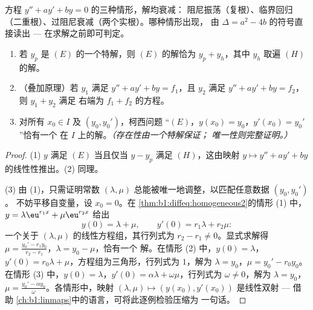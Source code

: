 \begin{omfigure}

{\small 方程 $y'' + ay' + by = 0$ 的三种情形，解均衰减：
阻尼振荡（复根）、临界回归
（二重根）、过阻尼衰减（两个实根）。哪种情形出现，
由 $\Delta = a^2 - 4b$ 的符号直接读出 ---
在求解之前即可判定。}
\end{omfigure}

\begin{theorem}[结构与柯西问题]\label{thm:b1:diffeq:structure2}
\begin{enumerate}
  \item 若 $y_p$ 是 $(E)$ 的一个特解，则
        $(E)$ 的解恰为 $y_p + y_h$，其中 $y_h$ 取遍
        $(H)$ 的解。
  \item （叠加原理）若 $y_1$ 满足 $y'' + ay' + by = f_1$，且
        $y_2$ 满足 $y'' + ay' + by = f_2$，则 $y_1 + y_2$ 满足
        右端为 $f_1 + f_2$ 的方程。
  \item 对所有 $x_0 \in I$ 及 $(y_0, y_0')$，柯西问题
        “$(E)$，$y(x_0) = y_0$，$y'(x_0) = y_0'$”恰有一个
        在 $I$ 上的解。\emph{（存在性由一个特解保证；
        唯一性则完整证明。）}
\end{enumerate}
\end{theorem}

\begin{proof}
(1) $y$ 满足 $(E)$ 当且仅当 $y - y_p$ 满足 $(H)$，这由映射 $y
\mapsto y'' + ay' + by$ 的线性性推出。(2) 同理。

(3) 由 (1)，只需证明常数 $(\lambda,
\mu)$ 总能被唯一地调整，以匹配任意数据 $(y_0, y_0')$。
不妨平移自变量，设 $x_0 = 0$。在
\cref{thm:b1:diffeq:homogeneous2}的情形 (1) 中，$y = \lambda\eu^{r_1x} +
\mu\eu^{r_2x}$ 给出
\[
y(0) = \lambda + \mu, \qquad y'(0) = r_1\lambda + r_2\mu :
\]
一个关于 $(\lambda, \mu)$ 的线性方程组，其行列式为 $r_2 -
r_1 \neq 0$。显式求解得 $\mu = \frac{y_0' -
r_1y_0}{r_2 - r_1}$，$\lambda = y_0 - \mu$，恰有一个
解。在情形 (2) 中，$y(0) = \lambda$，$y'(0) = r_0\lambda +
\mu$，方程组为三角形，行列式为 $1$，解为
$\lambda = y_0$，$\mu = y_0' - r_0y_0$。在情形 (3) 中，$y(0) =
\lambda$，$y'(0) = \alpha\lambda + \omega\mu$，行列式为
$\omega \neq 0$，解为 $\lambda = y_0$，$\mu = \frac{y_0' -
\alpha y_0}\omega$。各情形中，映射 $(\lambda, \mu) \mapsto
(y(x_0), y'(x_0))$ 是线性双射 --- 借助
\cref{ch:b1:linmaps}中的语言，可将此逐例检验压缩为
一句话。
\end{proof}


